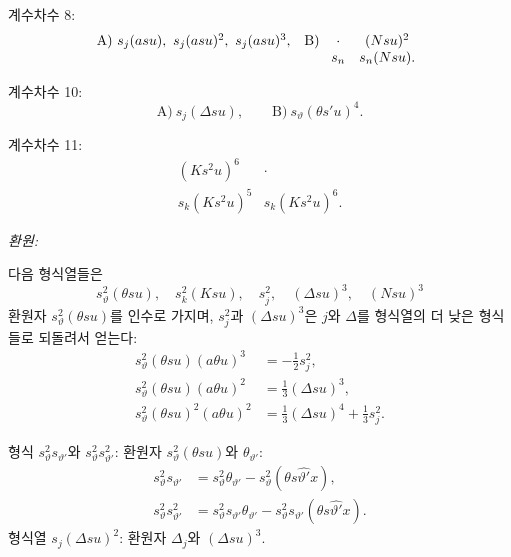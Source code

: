 \noindent 계수차수 8:
\[
\begin{array}{ll}
\text{A)}\ s_j(asu),\ s_j(asu)^2,\ s_j(asu)^3,
&
\text{B)}\ \begin{array}[t]{cc}
\cdot&(Nsu)^2\\
s_n&s_n(Nsu).
\end{array}
\end{array}
\]

\noindent 계수차수 10:
\[
\text{A)}\ s_j(\Delta su),\qquad \text{B)}\ s_\vartheta(\theta s'u)^4.
\]

\noindent 계수차수 11:
\[
\begin{array}{cc}
(Ks^2u)^6&\cdot\\
s_k(Ks^2u)^5&s_k(Ks^2u)^6.
\end{array}
\]

\noindent\emph{환원:}

다음 형식열들은
\[
 s_\vartheta^2(\theta su),\quad s_k^2(Ksu),\quad s_j^2,\quad (\Delta su)^3,\quad (Nsu)^3
\]
환원자 $s_\vartheta^2(\theta su)$를 인수로 가지며, $s_j^2$과 $(\Delta su)^3$은 $j$와 $\Delta$를 형식열의 더 낮은 형식들로 되돌려서 얻는다:
\[
\begin{aligned}
s_\vartheta^2(\theta su)(a\theta u)^3&=-\frac12s_j^2,\\
s_\vartheta^2(\theta su)(a\theta u)^2&=\frac13(\Delta su)^3,\\
s_\vartheta^2(\theta su)^2(a\theta u)^2&=\frac13(\Delta su)^4+\frac13s_j^2.
\end{aligned}
\]

형식 $s_\vartheta^2s_{\vartheta'}$와 $s_\vartheta^2s_{\vartheta'}^2$: 환원자 $s_\vartheta^2(\theta su)$와 $\theta_{\vartheta'}$:
\[
\begin{aligned}
s_\vartheta^2s_{\vartheta'}&=s_\vartheta^2\theta_{\vartheta'}-s_\vartheta^2(\theta s\widehat{\vartheta'}x),\\
s_\vartheta^2s_{\vartheta'}^2&=s_\vartheta^2s_{\vartheta'}\theta_{\vartheta'}-s_\vartheta^2s_{\vartheta'}(\theta s\widehat{\vartheta'}x).
\end{aligned}
\]
형식열 $s_j(\Delta su)^2$: 환원자 $\Delta_j$와 $(\Delta su)^3$.

